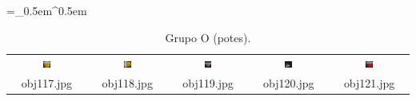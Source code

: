 \begin{table}[H]
  \centering
  \caption{Grupo O (potes).}
  \tabulinesep =_0.5em^0.5em
  \everyrow{\tabucline[0.4pt]-}
  \begin{tabu}{|ccccc|}
    \includegraphics[width=0.1\textwidth,height=0.1\textwidth]{imagens/coil_100/potes/obj70__0.png} &
    \includegraphics[width=0.1\textwidth,height=0.1\textwidth]{imagens/coil_100/potes/obj70__0_1.png} &
    \includegraphics[width=0.1\textwidth,height=0.1\textwidth]{imagens/coil_100/potes/obj72__0.png} &
    \includegraphics[width=0.1\textwidth,height=0.1\textwidth]{imagens/coil_100/potes/obj72__0_1.png} &
    \includegraphics[width=0.1\textwidth,height=0.1\textwidth]{imagens/coil_100/potes/obj95__0.png}
    \\
    \scriptsize{obj117.jpg} & \scriptsize{obj118.jpg} & \scriptsize{obj119.jpg} &
    \scriptsize{obj120.jpg} & \scriptsize{obj121.jpg}
  \end{tabu}
\end{table}

